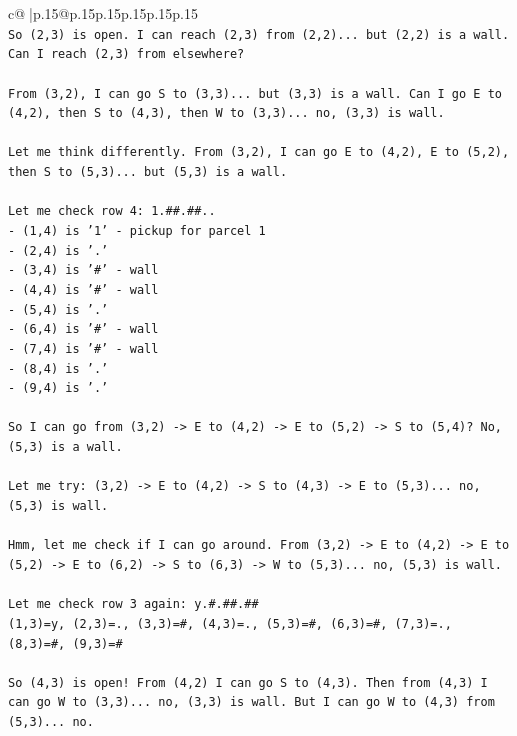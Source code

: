 \documentclass{article}
\begin{document}
{\begin{supertabular}{c@{$\;$}|p{.15\linewidth}@{}p{.15\linewidth}p{.15\linewidth}p{.15\linewidth}p{.15\linewidth}p{.15\linewidth}}
{{{\\ 
\texttt{So (2,3) is open. I can reach (2,3) from (2,2)... but (2,2) is a wall. Can I reach (2,3) from elsewhere?} \\
\\ 
\texttt{From (3,2), I can go S to (3,3)... but (3,3) is a wall. Can I go E to (4,2), then S to (4,3), then W to (3,3)... no, (3,3) is wall.} \\
\\ 
\texttt{Let me think differently. From (3,2), I can go E to (4,2), E to (5,2), then S to (5,3)... but (5,3) is a wall.} \\
\\ 
\texttt{Let me check row 4: 1.\#\#.\#\#..} \\
\texttt{{-} (1,4) is '1' {-} pickup for parcel 1} \\
\texttt{{-} (2,4) is '.'} \\
\texttt{{-} (3,4) is '\#' {-} wall} \\
\texttt{{-} (4,4) is '\#' {-} wall} \\
\texttt{{-} (5,4) is '.'} \\
\texttt{{-} (6,4) is '\#' {-} wall} \\
\texttt{{-} (7,4) is '\#' {-} wall} \\
\texttt{{-} (8,4) is '.'} \\
\texttt{{-} (9,4) is '.'} \\
\\ 
\texttt{So I can go from (3,2) {-}> E to (4,2) {-}> E to (5,2) {-}> S to (5,4)? No, (5,3) is a wall.} \\
\\ 
\texttt{Let me try: (3,2) {-}> E to (4,2) {-}> S to (4,3) {-}> E to (5,3)... no, (5,3) is wall.} \\
\\ 
\texttt{Hmm, let me check if I can go around. From (3,2) {-}> E to (4,2) {-}> E to (5,2) {-}> E to (6,2) {-}> S to (6,3) {-}> W to (5,3)... no, (5,3) is wall.} \\
\\ 
\texttt{Let me check row 3 again: y.\#.\#\#.\#\#} \\
\texttt{(1,3)=y, (2,3)=., (3,3)=\#, (4,3)=., (5,3)=\#, (6,3)=\#, (7,3)=., (8,3)=\#, (9,3)=\#} \\
\\ 
\texttt{So (4,3) is open! From (4,2) I can go S to (4,3). Then from (4,3) I can go W to (3,3)... no, (3,3) is wall. But I can go W to (4,3) from (5,3)... no.} \\
\\ 
}}}
\end{supertabular}}
\end{document}
